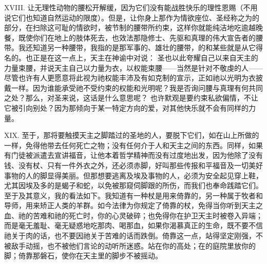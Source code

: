 XVIII. 让无理性动物的腰松开解缓，因为它们没有能战胜快乐的理性恩赐（不用说它们也知道自然运动的限度）。但是，让你身上那作为情欲座位、圣经称之为的部分，在扫除这可耻的情欲时，被节制的腰带所约束，这样你就能纯洁地吃逾越晚餐，既使你们在地上的肢体死去，也效法那隐修士、先驱和真理的伟大宣告者的腰带。我还知道另一种腰带，我指的是那军事的、雄壮的腰带，的和某些就是从它得名的。也正是在这一点上，天主在神谕中对说： 圣也以此夸耀自己以来自天主的力量束腰，并说天主自己以力量为衣，以权能束腰——当然是针对不敬虔的人——尽管也许有人更愿意将此视为祂权能丰沛及有如克制的宣示，正如祂以光明为衣披戴一样。因为谁能承受祂不受约束的权能和光明呢？我是否询问腰与真理有何共同之处？那么，对圣来说，这话是什么意思呢？ 也许默观是要约束私欲偏情，不让它被引向别处？因为那倾向于某一特定方向的爱，对其他快乐就不会有同样的力量。\par

XIX. 至于，那将要触摸天主之脚踏过的圣地的人，要脱下它们，如在山上所做的一样，免得他带去任何死亡之物；没有任何介于人和天主之间的东西。同样，如果有门徒被派遣去宣讲福音，让他本着哲学精神而没有过度地出发，因为他除了没有钱、没有杖、只有一件外衣之外，还必须赤脚，好叫那些传报和平福音及一切美好事物的人的脚显得美丽。但那想要逃离及埃及事物的人，必须为安全起见穿上鞋，尤其因埃及多的是蝎子和蛇，以免被那窥伺脚跟的所伤，而我们也奉命践踏它们。至于及其意义，我的看法如下。我知道有一种杖是用来倚靠的，另一种属于牧者和导师，用来矫正人类的羊群。如今法律为你规定了倚靠的杖，免得当你听到天主之血、祂的苦难和祂的死亡时，你的心灵破碎；也免得你在护卫天主时被卷入异端；而是毫无羞耻、毫无疑惑地吃那肉、喝那血，如果你渴慕真正的生命，既不要不信祂关于肉的话，也不要因祂关于苦难的话而跌倒。倚靠这一点，站得坚定刚强，不被敌手动摇，也不被他们言论的动听所迷惑。站在你的高处；在的庭院里放你的脚；倚靠那磐石，使你在天主里的脚步不被摇动。\par

